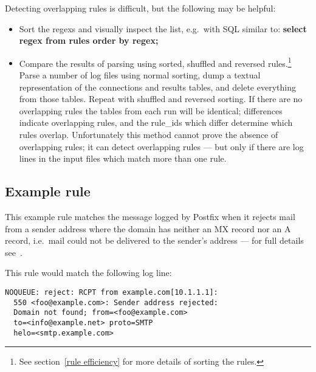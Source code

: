\documentclass[a4paper,12pt,draft]{article}
\begin{document}
Detecting overlapping rules is difficult, but the following may be helpful:

\begin{itemize}

    \item Sort the regexs and visually inspect the list, e.g.\ with SQL
        similar to: \textbf{select regex from rules order by regex;}

    \item Compare the results of parsing using sorted, shuffled and
        reversed rules.\footnote{See section~\ref{rule efficiency} for more
        details of sorting the rules.}  Parse a number of log files using
        normal sorting, dump a textual representation of the connections
        and results tables, and delete everything from those tables.
        Repeat with shuffled and reversed sorting.  If there are no
        overlapping rules the tables from each run will be identical;
        differences indicate overlapping rules, and the rule\_ids which
        differ determine which rules overlap.  Unfortunately this method
        cannot prove the absence of overlapping rules; it can detect
        overlapping rules --- but only if there are log lines in the input
        files which match more than one rule.

\end{itemize}

\subsection{Example rule}

This example rule matches the message logged by Postfix when it rejects
mail from a sender address where the domain has neither an MX record nor an
A record, i.e.\ mail could not be delivered to the sender's address --- for
full details see~\cite{reject-unknown-sender-domain}.

This rule would match the following log line:

\begin{verbatim}
NOQUEUE: reject: RCPT from example.com[10.1.1.1]: 
  550 <foo@example.com>: Sender address rejected:
  Domain not found; from=<foo@example.com>
  to=<info@example.net> proto=SMTP
  helo=<smtp.example.com>
\end{verbatim}
\end{document}
